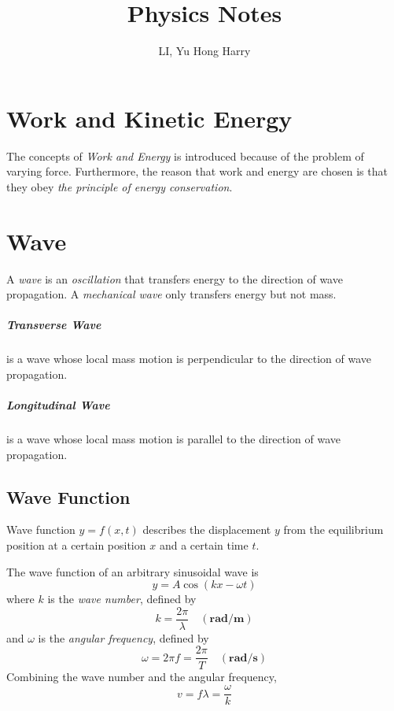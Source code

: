 \documentclass{note}
\title{Physics Notes}
\author{LI, Yu Hong Harry}
\begin{document}
\maketitle

\chapter{Work and Kinetic Energy}

The concepts of \textit{Work and Energy} is introduced because of the problem of varying force. Furthermore, the reason that work and energy are chosen is that they obey \textit{the principle of energy conservation}.

\chapter{Wave}

A \textit{wave} is an \textit{oscillation} that transfers energy to the direction of wave propagation. A \textit{mechanical wave} only transfers energy but not mass.

\paragraph{Transverse Wave} is a wave whose local mass motion is perpendicular to the direction of wave propagation.

\paragraph{Longitudinal Wave} is a wave whose local mass motion is parallel to the direction of wave propagation.

\section{Wave Function}

Wave function \(y = f(x, t)\) describes the displacement \(y\) from the equilibrium position at a certain position \(x\) and a certain time \(t\).

The wave function of an arbitrary sinusoidal wave is
\[
  y = A \cos(k x - \omega t)
\]
where \(k\) is the \textit{wave number}, defined by
\[
  k = \frac{2\pi}{\lambda} \quad \mathbf{(rad/m)}
\]
and \(\omega\) is the \textit{angular frequency}, defined by
\[
  \omega = 2\pi f = \frac{2\pi}{T} \quad \mathbf{(rad/s)}
\]
Combining the wave number and the angular frequency,
\[
  v = f \lambda = \frac{\omega}{k}
\]
\end{document}
